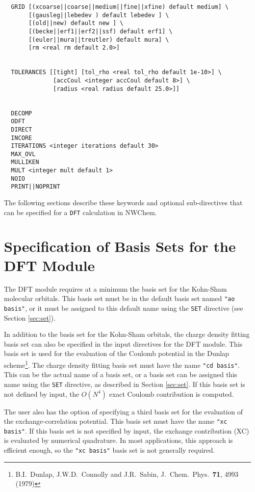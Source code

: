 \begin{verbatim}
  GRID [(xcoarse||coarse||medium||fine||xfine) default medium] \
       [(gausleg||lebedev ) default lebedev ] \
       [(old||new) default new ] \
       [(becke||erf1||erf2||ssf) default erf1] \
       [(euler||mura||treutler) default mura] \
       [rm <real rm default 2.0>]
        

  TOLERANCES [[tight] [tol_rho <real tol_rho default 1e-10>] \
              [accCoul <integer accCoul default 8>] \
              [radius <real radius default 25.0>]]


  DECOMP
  ODFT
  DIRECT
  INCORE
  ITERATIONS <integer iterations default 30>
  MAX_OVL
  MULLIKEN
  MULT <integer mult default 1>
  NOIO
  PRINT||NOPRINT
\end{verbatim}

The following 
sections describe these keywords and
optional sub-directives that can be specified for a \verb+DFT+ calculation
in NWChem.

\section{Specification of Basis Sets for the DFT Module}

The DFT module requires at a minimum the basis set for the Kohn-Sham 
molecular orbitals.  This basis set must be in the default basis set named
{\tt "ao basis"}, or it must be assigned to this default name using the
\verb+SET+ directive (see Section \ref{sec:set}).

In addition to the basis set for the Kohn-Sham orbitals, 
the charge density fitting basis set can also be specified in the 
input directives for the DFT module.  This basis set is used for the 
evaluation of the Coulomb potential in the Dunlap scheme\footnote{B.I.~Dunlap, 
J.W.D.~Connolly and J.R.~Sabin, J.~Chem.~Phys.~{\bf 71},  4993 (1979)}.
The charge density fitting basis set must have the name {\tt "cd basis"}.
This can be the actual name of a basis set, or a basis set can be 
assigned this name using the \verb+SET+ directive, as described in
Section \ref{sec:set}.  If this basis set is not defined by input,
the $O(N^4)$ exact Coulomb contribution is computed.

The user also has the option of specifying a third basis set for the 
evaluation of the exchange-correlation potential.  This basis set must
have the name {\tt "xc basis"}.  If this basis set is not specified
by input, the exchange contribution (XC) is evaluated by numerical
quadrature.  In most applications, this approach is efficient enough,
so the {\tt "xc basis"} basis set is not generally required.

